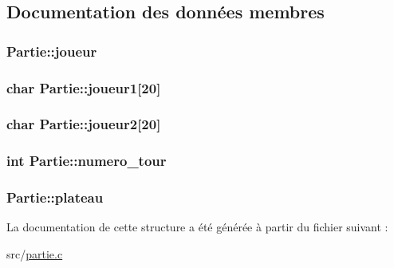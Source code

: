 \subsection{\-Documentation des données membres}
\hypertarget{structPartie_a8b5c0c007da53d6d723f4300a1d9d4ad}{
\subsubsection[{joueur}]{ {\bf \-Partie\-::joueur}}}\label{structPartie_a8b5c0c007da53d6d723f4300a1d9d4ad}
\hypertarget{structPartie_a42905bbdce5ccfd367a1b4195a433e01}{
\subsubsection[{joueur1}]{\setlength{\rightskip}{0pt plus 5cm}char {\bf \-Partie\-::joueur1}\mbox{[}20\mbox{]}}}\label{structPartie_a42905bbdce5ccfd367a1b4195a433e01}
\hypertarget{structPartie_a90dd0f2162050b2f3169dcb860d975cf}{
\subsubsection[{joueur2}]{\setlength{\rightskip}{0pt plus 5cm}char {\bf \-Partie\-::joueur2}\mbox{[}20\mbox{]}}}\label{structPartie_a90dd0f2162050b2f3169dcb860d975cf}
\hypertarget{structPartie_a8b9894676f682941f84fc1ad6cac1155}{
\subsubsection[{numero\-\_\-tour}]{\setlength{\rightskip}{0pt plus 5cm}int {\bf \-Partie\-::numero\-\_\-tour}}}\label{structPartie_a8b9894676f682941f84fc1ad6cac1155}
\hypertarget{structPartie_ae8a9b67f286f8bfd3e3a574f0ac2ac67}{
\subsubsection[{plateau}]{ {\bf \-Partie\-::plateau}}}\label{structPartie_ae8a9b67f286f8bfd3e3a574f0ac2ac67}


\-La documentation de cette structure a été générée à partir du fichier suivant \-:\begin{DoxyCompactItemize}
\item 
src/\hyperlink{partie_8c}{partie.\-c}\end{DoxyCompactItemize}
